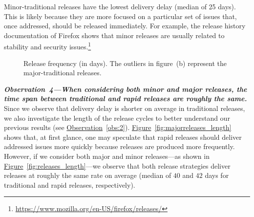 Minor-traditional releases have the lowest delivery delay (median of 25
days). This is likely because they are more focused on a particular set of
issues that, once addressed, should be released immediately. For example, the
release history documentation of Firefox shows that minor releases are usually
related to stability and security
issues.\footnote{\url{https://www.mozilla.org/en-US/firefox/releases/}}\\

\begin{figure}[t!]
	\centering
	\caption{Release frequency (in days). The outliers in figure~(b)
		represent the major-traditional releases.}
	\label{fig:release_length_analysis}
\end{figure}

\noindent\textit{\textbf{Observation~4---When considering both
minor and major releases, the time span between traditional and rapid releases
are roughly the same.}}
Since we observe that delivery delay is shorter on average in traditional
releases, we also investigate the length of the release cycles to better
understand our previous results (see \hyperref[obs:2]{Observation}~\ref{obs:2}).
\hyperref[fig:majorreleases_length]{Figure}~\ref{fig:majorreleases_length} shows that, at first glance, one may
speculate that rapid releases should deliver addressed issues more quickly
because releases are produced more frequently.  However, if we consider both
major and minor releases---as shown in \hyperref[fig:releases_length]{Figure}~\ref{fig:releases_length}---we
observe that both release strategies deliver releases at roughly the same rate
on average (median of $40$ and $42$ days for traditional and rapid releases,
respectively).\\

